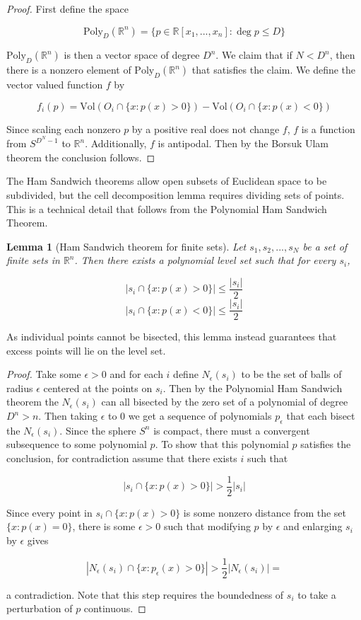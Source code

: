 \documentclass[12pt]{amsart}
\newtheorem{lemma}[theorem]{Lemma}
\begin{document}
\begin{proof}

    First define the space 

    \[\text{Poly}_D(\mathbb{R}^n) = \{p \in \mathbb{R}[x_1, ..., x_n]: \deg  p \leq D\}\]

    $\text{Poly}_D(\mathbb{R}^n)$ is then a vector space of degree $D^n$. We claim that if $N < D^n$, then there is a nonzero element of $\text{Poly}_D(\mathbb{R}^n)$ that satisfies the claim. We define the vector valued function $f$ by 

    \[f_i(p) = \text{Vol}(O_i \cap \{x: p(x) > 0\}) - \text{Vol}(O_i \cap \{x: p(x) < 0\})\] 

    Since scaling each nonzero $p$ by a positive real does not change $f$, $f$ is a function from $S^{D^{N}-1}$ to $\mathbb{R}^n$. Additionally, $f$ is antipodal. Then by the Borsuk Ulam theorem the conclusion follows. 
\end{proof}

The Ham Sandwich theorems allow open subsets of Euclidean space to be subdivided, but the cell decomposition lemma requires dividing sets of points. This is a technical detail that follows from the Polynomial Ham Sandwich Theorem. 

\begin{lemma}[Ham Sandwich theorem for finite sets]
Let $s_1,s_2,... ,s_N$ be a set of finite sets in $\mathbb{R}^n$. Then there exists a polynomial level set such that for every $s_i$, 

\[|s_i \cap \{x: p(x) > 0\}| \leq \frac{|s_i|}{2} \]
\[|s_i \cap \{x: p(x) < 0\}| \leq \frac{|s_i|}{2} \]
\end{lemma}

As individual points cannot be bisected, this lemma instead guarantees that excess points will lie on the level set. 

\begin{proof}
Take some $\epsilon > 0$ and for each $i$ define $N_\epsilon(s_i)$ to be the set of balls of radius $\epsilon$ centered at the points on $s_i$. Then by the Polynomial Ham Sandwich theorem the $N_\epsilon(s_i)$ can all bisected by the zero set of a polynomial of degree $D^n > n$. Then taking $\epsilon$ to 0 we get a sequence of polynomials $p_\epsilon$ that each bisect the $N_\epsilon(s_i)$. Since the sphere $S^n$ is compact, there must a convergent subsequence to some polynomial $p$. To show that this polynomial $p$ satisfies the conclusion, for contradiction assume that there exists $i$ such that

\[|s_i \cap \{x: p(x) > 0\}| > \frac{1}{2} |s_i|\] 

Since every point in $s_i \cap \{x: p(x) > 0\}$ is some nonzero distance from the set $\{x: p(x) = 0\}$, there is some $\epsilon > 0$ such that modifying $p$ by $\epsilon$ and enlarging $s_i$ by $\epsilon$ gives 

\[|N_\epsilon(s_i) \cap \{x: p_\epsilon(x) > 0\}| > \frac{1}{2} |N_\epsilon(s_i)| = \] 

a contradiction. Note that this step requires the boundedness of $s_i$ to take a perturbation of $p$ continuous. 
\end{proof}
\end{document}
